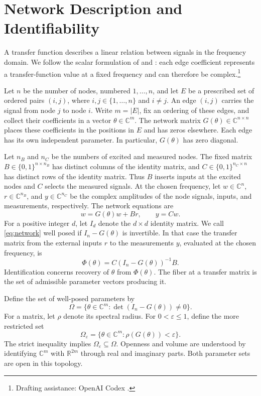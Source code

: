 \documentclass[letterpaper,10pt,conference]{ieeeconf}
\newcommand{\aicite}{\footnote{Drafting assistance: OpenAI Codex \cite{codex}.}\space}
\begin{document}
\section{Network Description and Identifiability}
\label{sec:setting}

A transfer function describes a linear relation between signals in the
frequency domain. We follow the scalar formulation of
\cite[Secs.~I and III]{LH20} and \cite[Sec.~III-B]{LH24}: each edge
coefficient represents a transfer-function value at a fixed frequency and
can therefore be complex.\aicite

Let \(n\) be the number of nodes, numbered \(1,\ldots,n\), and let \(E\)
be a prescribed set of ordered pairs \((i,j)\), where
\(i,j\in\{1,\ldots,n\}\) and \(i\ne j\). An edge
\((i,j)\) carries the signal from node \(j\) to node \(i\).
Write \(m=|E|\), fix an ordering of these edges, and collect their
coefficients in a vector \(\theta\in\mathbb C^m\). The network matrix
\(G(\theta)\in\mathbb C^{n\times n}\) places these coefficients in the
positions in \(E\) and has zeros elsewhere. Each edge has its own
independent parameter. In particular, \(G(\theta)\) has zero diagonal.

Let \(n_B\) and \(n_C\) be the numbers of excited and measured nodes.
The fixed matrix \(B\in\{0,1\}^{n\times n_B}\) has distinct columns of
the identity matrix, and \(C\in\{0,1\}^{n_C\times n}\) has distinct rows
of the identity matrix. Thus \(B\) inserts inputs at the excited nodes
and \(C\) selects the measured signals. At the chosen frequency, let
\(w\in\mathbb C^n\), \(r\in\mathbb C^{n_B}\), and
\(y\in\mathbb C^{n_C}\) be the complex amplitudes of the node signals,
inputs, and measurements, respectively. The network equations are
\begin{equation}\label{eq:network}
 w=G(\theta)w+Br,\qquad y=Cw.
\end{equation}
For a positive integer \(d\), let \(I_d\) denote the \(d\times d\)
identity matrix. We call \eqref{eq:network} well posed if
\(I_n-G(\theta)\) is invertible. In that case the transfer matrix
from the external inputs \(r\) to the measurements \(y\), evaluated
at the chosen frequency, is
\begin{equation}\label{eq:observation}
 \Phi(\theta)=C(I_n-G(\theta))^{-1}B.
\end{equation}
Identification concerns recovery of \(\theta\) from \(\Phi(\theta)\).
The fiber at a transfer matrix is the set of admissible parameter
vectors producing it.

Define the set of well-posed parameters by
\[
 \Omega=\{\theta\in\mathbb C^m:\det(I_n-G(\theta))\ne0\}.
\]
For a matrix, let \(\rho\) denote its spectral radius. For
\(0<\varepsilon\le1\), define the more restricted set
\begin{equation}\label{eq:domain}
 \Omega_\varepsilon
   =\{\theta\in\mathbb C^m:\rho(G(\theta))<\varepsilon\}.
\end{equation}
The strict inequality implies \(\Omega_\varepsilon\subseteq\Omega\).
Openness and volume are understood by identifying \(\mathbb C^m\)
with \(\mathbb R^{2m}\) through real and imaginary parts.
Both parameter sets are open in this topology.
\end{document}
